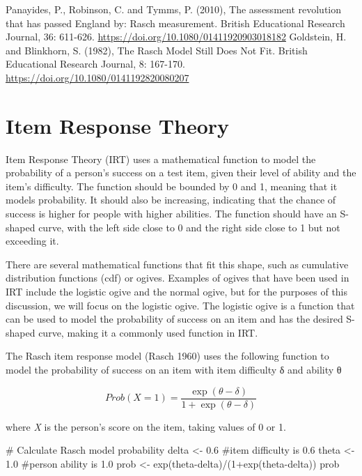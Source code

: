 \documentclass[
  letterpaper,
  DIV=11,
  numbers=noendperiod]{scrreprt}
\newenvironment{Shaded}{\begin{snugshade}}{\end{snugshade}}
\newcommand{\CommentTok}[1]{\textcolor[rgb]{0.37,0.37,0.37}{#1}}
\newcommand{\DecValTok}[1]{\textcolor[rgb]{0.68,0.00,0.00}{#1}}
\newcommand{\FloatTok}[1]{\textcolor[rgb]{0.68,0.00,0.00}{#1}}
\newcommand{\FunctionTok}[1]{\textcolor[rgb]{0.28,0.35,0.67}{#1}}
\newcommand{\NormalTok}[1]{\textcolor[rgb]{0.00,0.23,0.31}{#1}}
\newcommand{\OtherTok}[1]{\textcolor[rgb]{0.00,0.23,0.31}{#1}}
\newcommand{\SpecialCharTok}[1]{\textcolor[rgb]{0.37,0.37,0.37}{#1}}
\begin{document}
Panayides, P., Robinson, C. and Tymms, P. (2010), The assessment
revolution that has passed England by: Rasch measurement. British
Educational Research Journal, 36: 611-626.
\url{https://doi.org/10.1080/01411920903018182} Goldstein, H. and
Blinkhorn, S. (1982), The Rasch Model Still Does Not Fit. British
Educational Research Journal, 8: 167-170.
\url{https://doi.org/10.1080/0141192820080207}

\hypertarget{item-response-theory}{%
\chapter{Item Response Theory}\label{item-response-theory}}

Item Response Theory (IRT) uses a mathematical function to model the
probability of a person's success on a test item, given their level of
ability and the item's difficulty. The function should be bounded by 0
and 1, meaning that it models probability. It should also be increasing,
indicating that the chance of success is higher for people with higher
abilities. The function should have an S-shaped curve, with the left
side close to 0 and the right side close to 1 but not exceeding it.

There are several mathematical functions that fit this shape, such as
cumulative distribution functions (cdf) or ogives. Examples of ogives
that have been used in IRT include the logistic ogive and the normal
ogive, but for the purposes of this discussion, we will focus on the
logistic ogive. The logistic ogive is a function that can be used to
model the probability of success on an item and has the desired S-shaped
curve, making it a commonly used function in IRT.

The Rasch item response model (Rasch 1960) uses the following function
to model the probability of success on an item with item difficulty δ
and ability θ

\[
Prob(X=1) = \frac{\exp(\theta - \delta)}{1+\exp(\theta - \delta)}
\]

where \emph{X} is the person's score on the item, taking values of 0 or
1.

\begin{Shaded}
\begin{Highlighting}[]
\CommentTok{\# Calculate Rasch model probability}
\NormalTok{delta }\OtherTok{\textless{}{-}} \FloatTok{0.6}  \CommentTok{\#item difficulty is 0.6}
\NormalTok{theta }\OtherTok{\textless{}{-}} \FloatTok{1.0}  \CommentTok{\#person ability is 1.0}
\NormalTok{prob }\OtherTok{\textless{}{-}} \FunctionTok{exp}\NormalTok{(theta}\SpecialCharTok{{-}}\NormalTok{delta)}\SpecialCharTok{/}\NormalTok{(}\DecValTok{1}\SpecialCharTok{+}\FunctionTok{exp}\NormalTok{(theta}\SpecialCharTok{{-}}\NormalTok{delta))}
\NormalTok{prob}
\end{Highlighting}
\end{Shaded}
\end{document}
